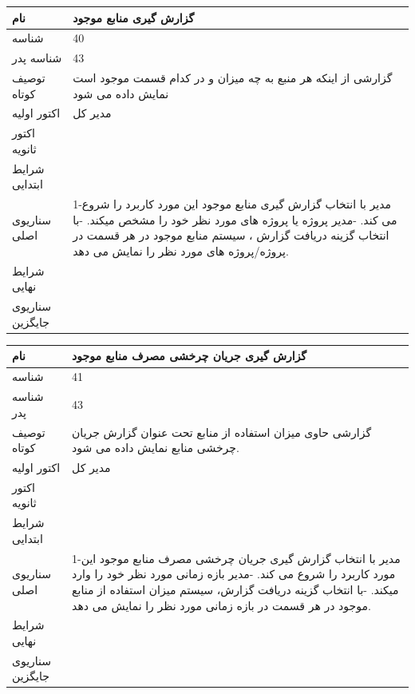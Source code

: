 \documentclass{article}
\begin{document}
\newpage

\begin{tabular}{|p{2cm}|p{10cm}|}
\hline
نام
&
گزارش گیری منابع موجود
\\
\hline
شناسه
&
40
\\
\hline
شناسه پدر
&
43
\\
\hline
توصیف کوتاه
&
گزارشی از اینکه هر منبع به چه میزان و در کدام قسمت موجود است نمایش داده می شود
\\
\hline
اکتور اولیه
&
مدیر کل
\\
\hline
اکتور ثانویه
&

\\
\hline
شرایط ابتدایی
&

\\
\hline
سناریوی اصلی
&
1-مدیر با انتخاب گزارش گیری منابع موجود  این مورد کاربرد را شروع می کند.
\newline
2-مدیر پروژه یا پروژه های مورد نظر خود را مشخص میکند.
\newline
3-با انتخاب گزینه دریافت گزارش ، سیستم منابع موجود در هر قسمت در پروژه/پروژه های مورد نظر را نمایش می دهد. 
\\
\hline
شرایط نهایی
&

\\
\hline
سناریوی جایگزین
&

\\
\hline
\end{tabular}

\vspace{2cm}

\begin{tabular}{|p{2cm}|p{10cm}|}
\hline
نام
&
گزارش گیری جریان چرخشی مصرف منابع موجود
\\
\hline
شناسه
&
41
\\
\hline
شناسه پدر
&
43
\\
\hline
توصیف کوتاه
&
گزارشی حاوی میزان استفاده از منابع تحت عنوان گزارش جریان چرخشی منابع نمایش داده می شود.
\\
\hline
اکتور اولیه
&
مدیر کل
\\
\hline
اکتور ثانویه
&

\\
\hline
شرایط ابتدایی
&

\\
\hline
سناریوی اصلی
&
1-مدیر با انتخاب گزارش گیری جریان چرخشی مصرف منابع موجود این مورد کاربرد را شروع می کند.
\newline
2-مدیر بازه زمانی مورد نظر خود را وارد میکند.
\newline
3-با انتخاب گزینه دریافت گزارش، سیستم میزان استفاده از منابع موجود در هر قسمت در بازه زمانی مورد نظر را نمایش می دهد. 
\\
\hline
شرایط نهایی
&

\\
\hline
سناریوی جایگزین
&

\\
\hline
\end{tabular}
\end{document}

